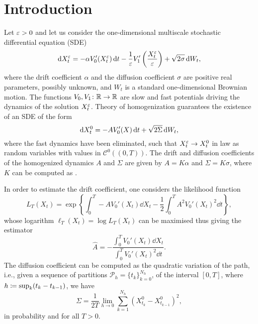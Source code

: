 \documentclass[10pt]{article}
\begin{document}
\maketitle	


%
%

\normalsize
\section{Introduction}

Let $\varepsilon > 0$ and let us consider the one-dimensional multiscale stochastic differential equation (SDE)
\begin{equation}\label{eq:SDE_MS}
	\mathrm{d} X_t^\varepsilon = -\alpha V_0'(X_t^\varepsilon) \,\mathrm{d} t - \frac1{\varepsilon} V_1'\left(\frac{X_t^\varepsilon}{\varepsilon}\right) + \sqrt{2\sigma} \,\mathrm{d} W_t,
\end{equation}
where the drift coefficient $\alpha$ and the diffusion coefficient $\sigma$ are positive real parameters, possibly unknown, and $W_t$ is a standard one-dimensional Brownian motion. The functions $V_0, V_1\colon \mathbb{R} \to \mathbb{R}$ are slow and fast potentials driving the dynamics of the solution $X_t^\varepsilon$. Theory of homogenization \cite{BLP78} guarantees the existence of an SDE of the form
\begin{equation}\label{eq:SDE_HOM}
	\mathrm{d} X_t^0 = -A V_0'(X) \,\mathrm{d} t + \sqrt{2\Sigma} \,\mathrm{d} W_t,
\end{equation}
where the fast dynamics have been eliminated, such that $X_t^\varepsilon \to X_t^0$ in law as random variables with values in $\mathcal C^0((0, T))$. The drift and diffusion coefficients of the homogenized dynamics $A$ and $\Sigma$ are given by $A = K\alpha$ and $\Sigma = K\sigma$, where $K$ can be computed as .

In order to estimate the drift coefficient, one considers the likelihood function
\begin{equation}
	L_T(X_t) = \exp\left\{\int_0^T -A V_0'(X_t) \dd X_t - \frac12 \int_0^T A^2 V_0'(X_t)^2 \dd t \right\},
\end{equation}
whose logarithm $\ell_T(X_t) = \log L_T(X_t)$ can be maximised thus giving the estimator
\begin{equation}
	\widehat A = - \frac{\int_0^T V_0'(X_t) \dd X_t}{\int_0^T V_0'(X_t)^2 \dd t}.
\end{equation}
The diffusion coefficient can be computed as the quadratic variation of the path, i.e., given a sequence of partitions $\mathcal P_h = \{t_{k}\}_{k=0}^{N_h}$, of the interval $[0, T]$, where $h \coloneqq \sup_k (t_k - t_{k-1})$, we have
\begin{equation}\label{eq:SigmaEst}
	\Sigma = \frac1{2T} \lim_{h\to 0} \sum_{k=1}^{N_h} (X^0_{t_k} - X^0_{t_{k-1}})^2,
\end{equation}
in probability and for all $T > 0$.
\end{document}
